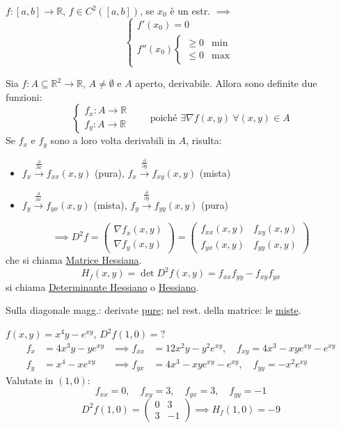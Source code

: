$f : [a, b] \to \mathbb{R}$, $f \in C^2([a, b])$, se $x_0$ è un estr. $\implies$
\[
\begin{cases}
f'(x_0) = 0 \\
f''(x_0) \begin{cases} \ge 0 & \text{min} \\ \le 0 & \text{max} \end{cases}
\end{cases}
\]

\begin{definition}
Sia $f : A \subseteq \mathbb{R}^2 \to \mathbb{R}$, $A \neq \emptyset$ e $A$ aperto, derivabile. Allora sono definite due funzioni:
\[
\begin{cases}
f_x : A \to \mathbb{R} \\
f_y : A \to \mathbb{R}
\end{cases}
\qquad \text{poiché } \exists \nabla f(x, y) \ \forall (x, y) \in A
\]
Se $f_x$ e $f_y$ sono a loro volta derivabili in $A$, risulta:
\begin{itemize}
    \item $f_x \xrightarrow{\frac{\partial}{\partial x}} f_{xx}(x, y)$ \quad (pura), \qquad $f_x \xrightarrow{\frac{\partial}{\partial y}} f_{xy}(x, y)$ \quad (mista)
    \item $f_y \xrightarrow{\frac{\partial}{\partial x}} f_{yx}(x, y)$ \quad (mista), \qquad $f_y \xrightarrow{\frac{\partial}{\partial y}} f_{yy}(x, y)$ \quad (pura)
\end{itemize}
\[
\implies D^2 f = \begin{pmatrix} \nabla f_x(x, y) \\ \nabla f_y(x, y) \end{pmatrix} = \begin{pmatrix} f_{xx}(x, y) & f_{xy}(x, y) \\ f_{yx}(x, y) & f_{yy}(x, y) \end{pmatrix}
\]
che si chiama \underline{Matrice Hessiana}.
\[
H_f(x, y) = \det D^2 f(x, y) = f_{xx} f_{yy} - f_{xy} f_{yx}
\]
si chiama \underline{Determinante Hessiano} o \underline{Hessiano}.

Sulla diagonale magg.: derivate \underline{pure}; nel rest. della matrice: le \underline{miste}.
\end{definition}

\begin{esercizio}
$f(x, y) = x^4 y - e^{xy}$, \quad $D^2 f(1, 0) = ?$
\begin{align*}
f_x &= 4x^3 y - y e^{xy} &\implies f_{xx} &= 12x^2 y - y^2 e^{xy}, \quad f_{xy} = 4x^3 - x y e^{xy} - e^{xy} \\
f_y &= x^4 - x e^{xy} &\implies f_{yx} &= 4x^3 - x y e^{xy} - e^{xy}, \quad f_{yy} = -x^2 e^{xy}
\end{align*}
Valutate in $(1, 0)$:
\[
f_{xx} = 0, \quad f_{xy} = 3, \quad f_{yx} = 3, \quad f_{yy} = -1
\]
\[
D^2 f(1, 0) = \begin{pmatrix} 0 & 3 \\ 3 & -1 \end{pmatrix} \implies H_f(1, 0) = -9
\]
\end{esercizio}

